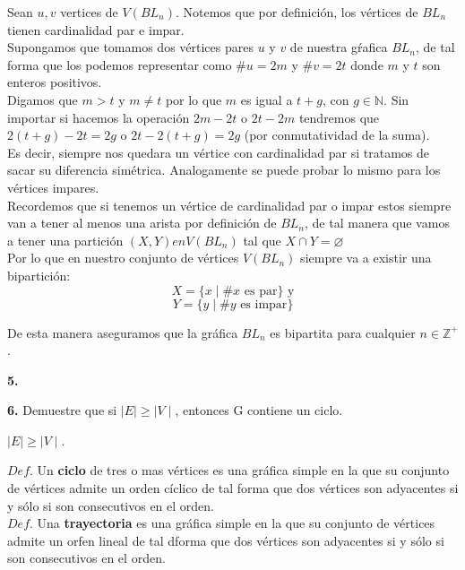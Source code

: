 \documentclass[12pt]{article}
\begin{document}
Sean $u,v$ vertices de $V(BL_n)$. Notemos que por definición, los vértices de $BL_n$  tienen cardinalidad par e impar.\\

Supongamos que tomamos dos vértices pares $u$ y $v$ de nuestra gŕafica $BL_n$, de tal forma que los podemos representar
como $\# u  = 2m$ y $\# v = 2t$ donde $m$ y $t$ son enteros positivos.\\

Digamos que $m > t$ y $m \neq t$ por lo que $m$ es igual a $t + g$, con $g \in \mathbb{N}$. Sin 
importar si hacemos la operación $2 m - 2t$ o $2t - 2m$ tendremos que $2 (t + g) - 2t = 2g$ o $2t - 2(t + g) = 2g$ (por conmutatividad de la suma).\\

Es decir, siempre nos quedara un vértice con cardinalidad par si tratamos de sacar su diferencia simétrica. Analogamente se puede probar lo mismo para los vértices impares.\\

Recordemos que si tenemos un vértice de cardinalidad par o impar estos siempre van a tener al menos una arista por definición de $BL_n$, de 
tal manera que vamos a tener una partición $(X, Y) en V(BL_n)$ tal que $X \cap Y = \varnothing$ \\

Por lo que en nuestro conjunto de vértices $V(BL_n)$ siempre va a existir una bipartición:
\[X = \{ x \mid \# x \text{ es par}\} \text{ y}\]
\[Y = \{ y \mid \# y \text{ es impar}\}\]

De esta manera aseguramos que la gráfica $BL_n$ es bipartita para cualquier $n \in \mathbb{Z^+}$.
\vspace{1cm}

%
%
\textbf{5.} 

%
%
\textbf{6.} Demuestre que si $\mid E \mid \geq\mid V \mid$, entonces G contiene un ciclo.

\begin{tcolorbox}[title=\textbf{Hipotesis}, colback=red!15!white, colframe=black!, breakable]
    $\mid E \mid \geq \mid V \mid$.
\end{tcolorbox}

\begin{tcolorbox}[title=\textbf{Definiciones}, colback=blue!15!white, colframe=black!]
    $Def$. Un \textbf{ciclo} de tres o mas vértices es una gráfica simple en la que su conjunto de
    vértices admite un orden cíclico de tal forma que dos vértices son adyacentes si y sólo si son consecutivos en el orden.\\

    $Def$. Una \textbf{trayectoria} es una gráfica simple en la que su conjunto de vértices admite un orfen lineal de tal dforma 
    que dos vértices son adyacentes si y sólo si son consecutivos en el orden.
\end{tcolorbox}
\end{document}
